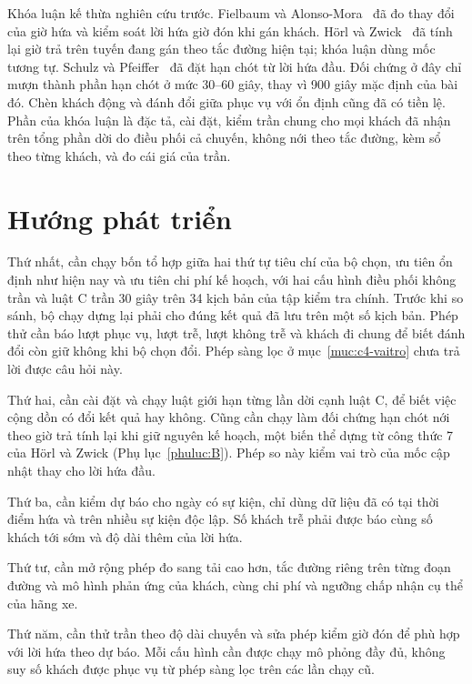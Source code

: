 Khóa luận kế thừa nghiên cứu trước. Fielbaum và Alonso-Mora~\cite{fielbaum2020} đã đo thay đổi của giờ hứa và kiểm soát lời hứa giờ đón khi gán khách. Hörl và Zwick~\cite{horl2022} đã tính lại giờ trả trên tuyến đang gán theo tắc đường hiện tại; khóa luận dùng mốc tương tự. Schulz và Pfeiffer~\cite{schulz2026} đã đặt hạn chót từ lời hứa đầu. Đối chứng ở đây chỉ mượn thành phần hạn chót ở mức 30--60 giây, thay vì 900 giây mặc định của bài đó. Chèn khách động và đánh đổi giữa phục vụ với ổn định cũng đã có tiền lệ. Phần của khóa luận là đặc tả, cài đặt, kiểm trần chung cho mọi khách đã nhận trên tổng phần dời do điều phối cả chuyến, không nới theo tắc đường, kèm sổ theo từng khách, và đo cái giá của trần.

\section{Hướng phát triển}
\label{muc:c5-huongphattrien}

Thứ nhất, cần chạy bốn tổ hợp giữa hai thứ tự tiêu chí của bộ chọn, ưu tiên ổn định như hiện nay và ưu tiên chi phí kế hoạch, với hai cấu hình điều phối không trần và luật C trần 30 giây trên 34 kịch bản của tập kiểm tra chính. Trước khi so sánh, bộ chạy dựng lại phải cho đúng kết quả đã lưu trên một số kịch bản. Phép thử cần báo lượt phục vụ, lượt trễ, lượt không trễ và khách đi chung để biết đánh đổi còn giữ không khi bộ chọn đổi. Phép sàng lọc ở mục~\ref{muc:c4-vaitro} chưa trả lời được câu hỏi này.

Thứ hai, cần cài đặt và chạy luật giới hạn từng lần dời cạnh luật C, để biết việc cộng dồn có đổi kết quả hay không. Cũng cần chạy làm đối chứng hạn chót nới theo giờ trả tính lại khi giữ nguyên kế hoạch, một biến thể dựng từ công thức 7 của Hörl và Zwick (Phụ lục~\ref{phuluc:B}). Phép so này kiểm vai trò của mốc cập nhật thay cho lời hứa đầu.

Thứ ba, cần kiểm dự báo cho ngày có sự kiện, chỉ dùng dữ liệu đã có tại thời điểm hứa và trên nhiều sự kiện độc lập. Số khách trễ phải được báo cùng số khách tới sớm và độ dài thêm của lời hứa.

Thứ tư, cần mở rộng phép đo sang tải cao hơn, tắc đường riêng trên từng đoạn đường và mô hình phản ứng của khách, cùng chi phí và ngưỡng chấp nhận cụ thể của hãng xe.

Thứ năm, cần thử trần theo độ dài chuyến và sửa phép kiểm giờ đón để phù hợp với lời hứa theo dự báo. Mỗi cấu hình cần được chạy mô phỏng đầy đủ, không suy số khách được phục vụ từ phép sàng lọc trên các lần chạy cũ.
